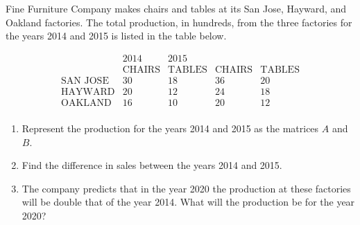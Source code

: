 \begin{example}


    Fine Furniture Company makes chairs and tables at its San Jose, Hayward, and Oakland factories. The total production, in hundreds, from the three factories for the years 2014 and 2015 is listed in the table below.

    \[
        \begin{array}{lcccc}
                            & \text{2014}   & \text{2015}                                   \\
                            & \text{CHAIRS} & \text{TABLES} & \text{CHAIRS} & \text{TABLES} \\
            \text{SAN JOSE} & 30            & 18            & 36            & 20            \\
            \text{HAYWARD}  & 20            & 12            & 24            & 18            \\
            \text{OAKLAND}  & 16            & 10            & 20            & 12            \\
        \end{array}
    \]
    \begin{enumerate}


        \item Represent the production for the years 2014 and 2015 as the matrices \( A \) and \( B \). \\
        \item Find the difference in sales between the years 2014 and 2015. \\
        \item The company predicts that in the year 2020 the production at these factories will be double that of the year 2014. What will the production be for the year 2020?
    \end{enumerate}
\end{example}

